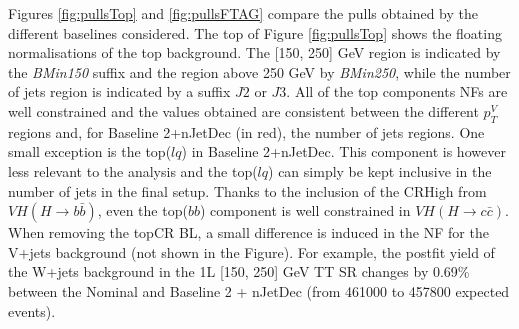 Figures \ref{fig:pullsTop} and \ref{fig:pullsFTAG} compare the pulls obtained by the different baselines considered. The top of Figure \ref{fig:pullsTop} shows the floating normalisations of the top background. The [150, 250] GeV region is indicated by the \textit{BMin150} suffix and the region above 250 GeV by \textit{BMin250}, while the number of jets region is indicated by a suffix $J2$ or $J3$. All of the top components NFs are well constrained and the values obtained are consistent between the different $p_T^V$ regions and, for Baseline 2+nJetDec (in red), the number of jets regions. One small exception is the top($lq$) in Baseline 2+nJetDec. This component is however less relevant to the analysis and the top($lq$) can simply be kept inclusive in the number of jets in the final setup. Thanks to the inclusion of the CRHigh from $VH(H\rightarrow b\bar{b})$, even the top($bb$) component is well constrained in $VH(H\rightarrow c\bar{c})$. When removing the topCR BL, a small difference is induced in the NF for the V+jets background (not shown in the Figure). For example, the postfit yield of the W+jets background in the 1L [150, 250] GeV TT SR changes by 0.69\% between the Nominal and Baseline 2 + nJetDec (from 461000 to 457800 expected events). \\

